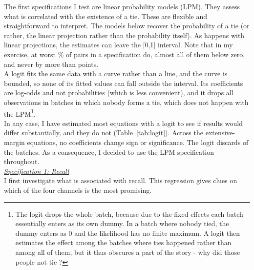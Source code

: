
\noindent The first specifications I test are linear probability models (LPM). They assess what is correlated with the existence of a tie. These are flexible and straightforward to interpret. The models below recover the probability of a tie (or rather, the linear projection rather than the probability itself). As happens with linear projections, the estimates can leave the [0,1] interval. Note that in my exercise, at worst \pnChanLpmOutsidePct{}\% of pairs in a specification do, almost all of them below zero, and never by more than \pnChanLpmMaxDevPp{} points. \\

\noindent A logit fits the same data with a curve rather than a line, and the curve is bounded, so none of its fitted values can fall outside the interval. Its coefficients are log-odds and not probabilities (which is less convenient), and it drops all observations in batches in which nobody forms a tie, which does not happen with the LPM\footnote{The logit drops the whole batch, because due to the fixed effects each batch essentially enters as its own dummy. In a batch where nobody tied, the dummy enters as 0 and the likelihood has no finite maximum. A logit then estimates the effect among the batches where ties happened rather than among all of them, but it thus obscures a part of the story - why did those people not tie ?}. \\

\noindent In any case, I have estimated most equations with a logit to see if results would differ substantially, and they do not (Table~\ref{tab:logit}).  Across the extensive-margin equations, no coefficients change sign or significance. The logit discards \pnChanLogitDropBatches{} of the \pnChanLogitBatches{} batches. As a consequence, I decided to use the LPM specification throughout. \\

\noindent \underline{\textit{Specification 1: Recall}} \\[0.4em]
I first investigate what is associated with recall. This regression gives clues on which of the four channels is the most promising. \\ 


